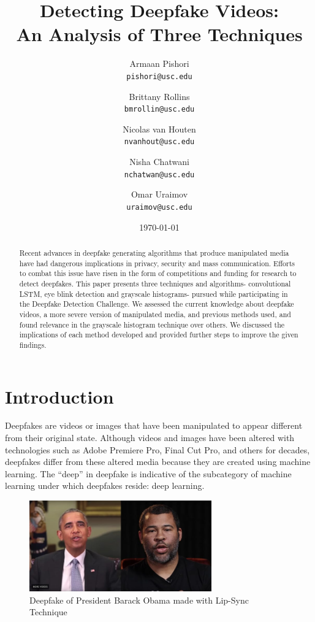 \documentclass[a4paper]{article}
\title{Detecting Deepfake Videos:\\ An Analysis of Three Techniques}
\author{
    Armaan Pishori\\
    \texttt{pishori@usc.edu}
    \and 
    Brittany Rollins\\
    \texttt{bmrollin@usc.edu}
    \and 
    Nicolas van Houten\\
    \texttt{nvanhout@usc.edu}
    \and 
    Nisha Chatwani\\
    \texttt{nchatwan@usc.edu}
    \and 
    Omar Uraimov\\
    \texttt{uraimov@usc.edu}
}
\date{\today}
\begin{document}
\maketitle

\begin{abstract}
Recent advances in deepfake generating algorithms that produce manipulated media have had dangerous implications in privacy, security and mass communication. Efforts to combat this issue have risen in the form of competitions and funding for research to detect deepfakes. This paper presents three techniques and algorithms- convolutional LSTM, eye blink detection and grayscale histograms- pursued while participating in the Deepfake Detection Challenge. We assessed the current knowledge about deepfake videos, a more severe version of manipulated media, and previous methods used, and found relevance in the grayscale histogram technique over others. We discussed the implications of each method developed and provided further steps to improve the given findings.
\end{abstract}


\section{Introduction}

Deepfakes are videos or images that have been manipulated to appear different from their original state. Although videos and images have been altered with technologies such as Adobe Premiere Pro, Final Cut Pro, and others for decades, deepfakes differ from these altered media because they are created using machine learning. The “deep” in deepfake is indicative of the subcategory of machine learning under which deepfakes reside: deep learning.

\begin{figure}[ht]
\centering
\includegraphics[width=0.7\textwidth]{images/obama_sync.jpg}
\caption{Deepfake of President Barack Obama made with Lip-Sync Technique \cite{Obama}}
\label{fig:Obama}
\end{figure}
\end{document}
